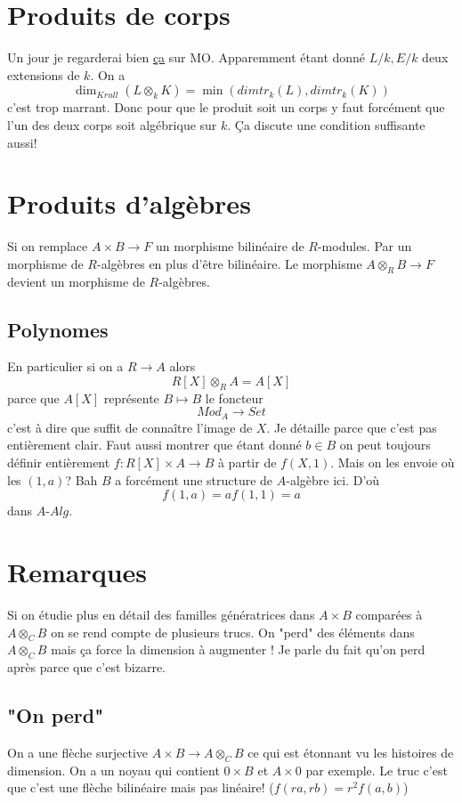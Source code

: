 \documentclass[a4paper,12pt]{article}
\theoremstyle{plain}
\theoremstyle{definition}
\theoremstyle{remark}
\begin{document}
\section{Produits de corps}
Un jour je regarderai bien  
\href{https://mathoverflow.net/questions/82083/when-is-the-tensor-product-of-two-fields-a-field}{ça} sur MO.
Apparemment étant donné $L/k, E/k$ deux extensions de $k$. On a
\[\dim_{Krull}(L\otimes_k K)=\min(dimtr_k(L),dimtr_k(K))\]
c'est trop marrant. Donc pour que le produit soit un corps
y faut forcément que l'un des deux corps soit algébrique sur $k$.
Ça discute une condition suffisante aussi!

\section{Produits d'algèbres}
Si on remplace $A\times B\to F$ un morphisme bilinéaire de 
$R$-modules. Par un morphisme de $R$-algèbres en plus d'être 
bilinéaire. Le morphisme $A\otimes_R B\to F$ devient un morphisme
de $R$-algèbres.
\subsection{Polynomes}
En particulier si on a $R\to A$ alors
\[R[X]\otimes_R A=A[X]\]
parce que $A[X]$ représente $B\mapsto B$ le foncteur 
\[Mod_A\to Set\]
c'est à dire que suffit de connaître l'image de $X$. 
Je détaille parce que c'est pas entièrement clair.
Faut aussi montrer que étant donné $b\in B$ on peut
toujours définir entièrement $f\colon R[X]\times A\to B$ 
à partir de $f(X,1)$. Mais on les envoie où les
$(1,a)$? Bah $B$ a forcément une structure de $A$-algèbre
ici. D'où 
\[f(1,a)=af(1,1)=a\]
dans $A$-$Alg$.

\section{Remarques}
Si on étudie plus en détail des familles génératrices dans 
$A\times B$ comparées à $A\otimes_C B$ on se rend compte de 
plusieurs trucs. On "perd" des éléments dans $A\otimes_C B$ mais
ça force la dimension à augmenter ! Je parle du fait qu'on perd
après parce que c'est bizarre.

\subsection{"On perd"}
On a une flèche surjective $A\times B\to A\otimes_C B$ ce qui est
étonnant vu les histoires de dimension. On a un noyau qui contient
$0\times B$ et $A\times 0$ par exemple. Le truc c'est que c'est
une flèche bilinéaire mais pas linéaire! ($f(ra,rb)=r^2f(a,b)$)
\end{document}
